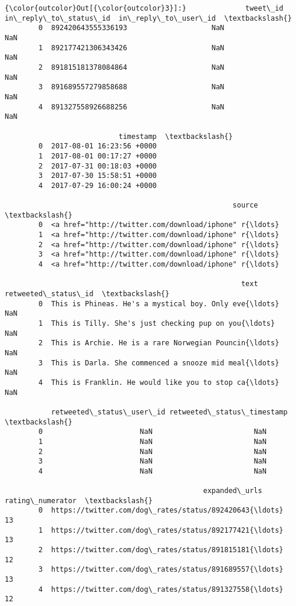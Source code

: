 \documentclass[11pt]{article}
\begin{document}
\begin{Verbatim}[commandchars=\\\{\}]
{\color{outcolor}Out[{\color{outcolor}3}]:}              tweet\_id  in\_reply\_to\_status\_id  in\_reply\_to\_user\_id  \textbackslash{}
        0  892420643555336193                    NaN                  NaN   
        1  892177421306343426                    NaN                  NaN   
        2  891815181378084864                    NaN                  NaN   
        3  891689557279858688                    NaN                  NaN   
        4  891327558926688256                    NaN                  NaN   
        
                           timestamp  \textbackslash{}
        0  2017-08-01 16:23:56 +0000   
        1  2017-08-01 00:17:27 +0000   
        2  2017-07-31 00:18:03 +0000   
        3  2017-07-30 15:58:51 +0000   
        4  2017-07-29 16:00:24 +0000   
        
                                                      source  \textbackslash{}
        0  <a href="http://twitter.com/download/iphone" r{\ldots}   
        1  <a href="http://twitter.com/download/iphone" r{\ldots}   
        2  <a href="http://twitter.com/download/iphone" r{\ldots}   
        3  <a href="http://twitter.com/download/iphone" r{\ldots}   
        4  <a href="http://twitter.com/download/iphone" r{\ldots}   
        
                                                        text  retweeted\_status\_id  \textbackslash{}
        0  This is Phineas. He's a mystical boy. Only eve{\ldots}                  NaN   
        1  This is Tilly. She's just checking pup on you{\ldots}                  NaN   
        2  This is Archie. He is a rare Norwegian Pouncin{\ldots}                  NaN   
        3  This is Darla. She commenced a snooze mid meal{\ldots}                  NaN   
        4  This is Franklin. He would like you to stop ca{\ldots}                  NaN   
        
           retweeted\_status\_user\_id retweeted\_status\_timestamp  \textbackslash{}
        0                       NaN                        NaN   
        1                       NaN                        NaN   
        2                       NaN                        NaN   
        3                       NaN                        NaN   
        4                       NaN                        NaN   
        
                                               expanded\_urls  rating\_numerator  \textbackslash{}
        0  https://twitter.com/dog\_rates/status/892420643{\ldots}                13   
        1  https://twitter.com/dog\_rates/status/892177421{\ldots}                13   
        2  https://twitter.com/dog\_rates/status/891815181{\ldots}                12   
        3  https://twitter.com/dog\_rates/status/891689557{\ldots}                13   
        4  https://twitter.com/dog\_rates/status/891327558{\ldots}                12   
        

\end{Verbatim}
\end{document}
